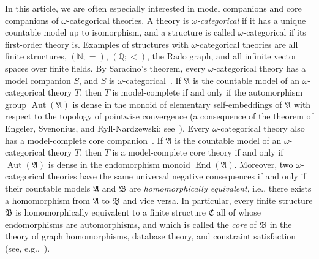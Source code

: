 \documentclass{amsart}
\theoremstyle{definition}
\theoremstyle{remark}
\numberwithin{equation}{section}
\newcommand{\bA}{\mathfrak{A}}
\newcommand{\bB}{\mathfrak{B}}
\newcommand{\bC}{\mathfrak{C}}
\newcommand{\Aut}{\operatorname{Aut}}
\newcommand{\End}{\operatorname{End}}
\begin{document}
In this article,
we are often especially interested in model companions and core companions  of $\omega$-categorical theories. A theory is \emph{$\omega$-categorical} if it has a unique countable model up to isomorphism, and a structure is called $\omega$-categorical if its first-order theory is. Examples of structures with $\omega$-categorical theories are all finite structures, $(\mathbb{N}; =)$, $(\mathbb{Q}; {<})$, the Rado graph, and {all} infinite vector spaces over finite fields. By Saracino's theorem, every $\omega$-categorical theory has a model companion $S$, and $S$ is $\omega$-categorical~\cite{Saracino}. 
If $\bA$ is the 
countable model of an $\omega$-categorical theory $T$,  
then $T$ is model-complete if and only if 
the automorphism group $\Aut(\bA)$ is dense in the monoid of elementary self-embeddings of $\bA$ with respect to the topology of pointwise convergence (a consequence of the theorem of Engeler, Svenonius, and Ryll-Nardzewski; see~\cite{HodgesLong,BodJunker}). Every $\omega$-categorical theory also has a model-complete core
companion~\cite{Cores-journal,BodHilsMartin-Journal}. If $\bA$ is the countable model of an $\omega$-categorical theory $T$,  then $T$ is a model-complete core theory if and only if $\Aut(\bA)$ is dense in the endomorphism monoid $\End(\bA)$. Moreover, two $\omega$-categorical theories have the same universal negative consequences if and only if their countable models $\bA$ and $\bB$ are \emph{homomorphically equivalent}, i.e.,
there exists a homomorphism from $\bA$ to $\bB$ and vice versa. 
In particular, every finite structure $\bB$ is homomorphically equivalent to a finite structure $\bC$ all of whose endomorphisms are automorphisms, and which is called the \emph{core} of $\bB$ in the theory of graph homomorphisms, database theory, and constraint satisfaction (see, e.g.,~\cite{HNBook}). 
\end{document}
